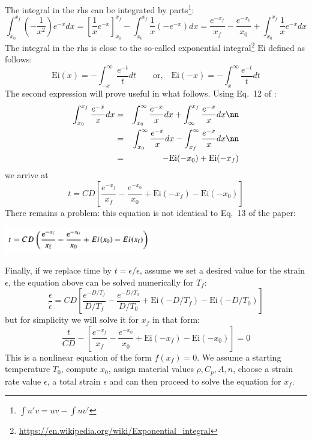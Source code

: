 The integral in the rhs can be integrated by parts\footnote{$\int u'v = uv - \int uv'$}:
\[
\int_{x_0}^{x_f} \left(-\frac{1}{x^2} \right) e^{-x} dx 
=  \left[\frac{1}{x} e^{-x} \right]_{x_0}^{x_f} - \int_{x_0}^{x_f} \frac{1}{x} (-e^{-x}) dx
= \frac{e^{-x_f}}{x_f}  - \frac{e^{-x_0}}{x_0}  +
\int_{x_0}^{x_f} \frac{1}{x} e^{-x} dx
\]
The integral in the rhs is close to the so-called 
exponential integral\footnote{\url{https://en.wikipedia.org/wiki/Exponential_integral}}
$\text{Ei}$ defined as follows:
\[
\text{Ei}(x)= - \int_{-x}^\infty \frac{e^{-t}}{t} dt 
\qquad \text{or,} \quad
\text{Ei}(-x)= -\int_{x}^\infty \frac{e^{-t}}{t} dt
\]
The second expression will prove useful in what follows.
Using Eq.~12 of \textcite{stuw98}: 
\begin{eqnarray}
\int_{x_0}^{x_f} \frac{ e^{-x}}{x}  dx
&=& \int_{x_0}^\infty \frac{e^{-x}   }{x}  dx + \int^{x_f}_\infty \frac{e^{-x}}{x}  dx \nn\\
&=& \int_{x_0}^\infty \frac{e^{-x}   }{x}  dx - \int_{x_f}^\infty \frac{e^{-x}}{x}  dx \nn\\
&=& -\text{Ei}(-x_0) + \text{Ei}(-x_f)
\end{eqnarray}
we arrive at 
\[
\boxed{
t= CD \left[
\frac{e^{-x_f}}{x_f}  - \frac{e^{-x_0}}{x_0}  
+ \text{Ei}(-x_f) -\text{Ei}(-x_0) 
\right]
}
\]
There remains a problem: this equation is not identical to Eq.~13 
of the paper:
\begin{center}
\includegraphics[width=6.5cm]{python_codes/fieldstone_167/images/stuw98_eq}
\end{center}


Finally, if we replace time by $t=\epsilon / \dot\epsilon$, assume we set a 
desired value for the strain $\epsilon$, the equation above can be solved numerically for $T_f$:
\[
\frac{\epsilon}{\dot\epsilon} = 
CD
\left[
\frac{e^{-D/T_f}}{D/T_f}  - \frac{e^{-D/T_0}}{D/T_0}  
+ \text{Ei}(-D/T_f) -\text{Ei}(-D/T_0) 
\right]
\]
but for simplicity we will solve it for $x_f$ in that form:
\begin{equation}
\frac{t}{CD}
-
\left[
\frac{e^{-x_f}}{x_f}  - \frac{e^{-x_0}}{x_0}  
+ \text{Ei}(-x_f) -\text{Ei}(-x_0) 
\right]
=0
\label{f167:eqnl}
\end{equation}
This is a nonlinear equation of the form $f(x_f)=0$. We assume a starting temperature $T_0$, 
compute $x_0$, assign material values $\rho,C_p,A,n$, choose a strain rate value $\dot\epsilon$, 
a total strain $\epsilon$ and can then proceed to solve the equation for $x_f$.




